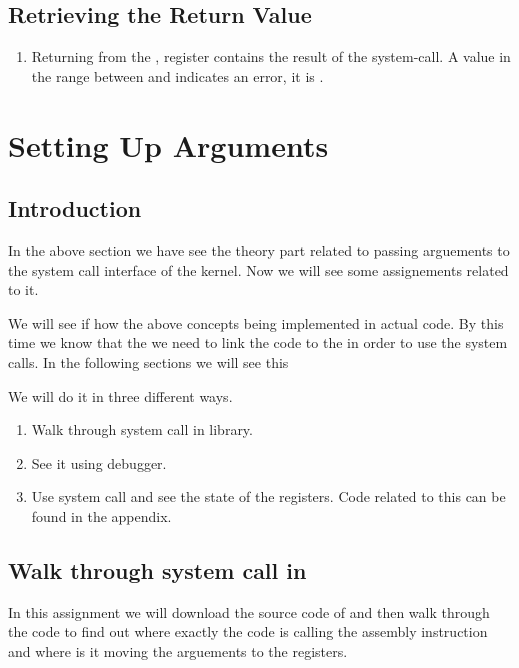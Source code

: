 \documentclass[letterpaper,10pt,english]{sphinxmanual}
\begin{document}
\section{Retrieving the Return Value}
\label{\detokenize{05_calling_system_calls:retrieving-the-return-value}}\begin{enumerate}
\item {} 
Returning from the , register  contains the result of the
system-call. A value in the range between  and  indicates an error, it
is .

\end{enumerate}


\chapter{Setting Up Arguments}
\label{\detokenize{06_setting_up_arguements:setting-up-arguments}}\label{\detokenize{06_setting_up_arguements::doc}}

\section{Introduction}
\label{\detokenize{06_setting_up_arguements:introduction}}
In the above section we have see the theory part related to passing arguements
to the system call interface of the kernel.  Now we will see some assignements
related to it.

We will see if how the above concepts being implemented in actual code. By this
time we know that the we need to link the code to the  in order to use
the system calls. In the following sections we will see this

We will do it in three different ways.
\begin{enumerate}
\item {} 
Walk through  system call in  library.

\item {} 
See it using debugger.

\item {} 
Use  system call and see the state of the registers. Code related to this can be found in the appendix.

\end{enumerate}


\section{Walk through  system call in }
\label{\detokenize{06_setting_up_arguements:walk-through-open-system-call-in-glibc}}
In this assignment we will download the source code of  and then walk through the code
to find out where exactly the code is calling the  assembly instruction and where is
it moving the arguements to the registers.
\end{document}

